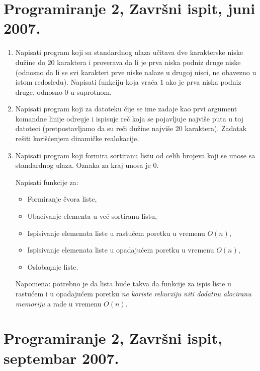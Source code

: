 \section{Programiranje 2, Zavr\v{s}ni ispit, juni 2007.}


\begin{enumerate}


\item
Napisati program koji sa standardnog ulaza u\v citava dve
karakterske niske du\v zine do $20$ karaktera i proverava da li je
prva niska podniz druge niske (odnosno da li se svi karakteri prve
niske nalaze u drugoj nisci, ne obavezno u istom redosledu).
Napisati funkciju koja vra\' ca $1$ ako je prva niska podniz
druge, odnosno $0$ u suprotnom.

\item
Napisati program koji za datoteku \v cije se ime zadaje kao prvi
argument komandne linije odre\d uje i ispisuje re\v c koja se
pojavljuje najvi\v se puta u toj datoteci (pretpostavljamo da su
re\v ci du\v zine najvi\v se $20$ karaktera). Zadatak re\v siti
kori\v s\' cenjem dinami\v cke realokacije.


\item
Napisati program koji formira sortiranu listu od celih brojeva
koji se unose sa standardnog ulaza. Oznaka za kraj unosa je $0$.

Napisati funkcije za:

\begin{itemize}
\item Formiranje \v cvora liste,
\item Ubacivanje elementa u ve\' c sortiranu listu,
\item Ispisivanje elemenata liste u rastu\' cem poretku u vremenu $O(n)$,
\item Ispisivanje elemenata liste u opadaju\' cem poretku u vremenu $O(n)$,
\item Osloba\d anje liste.
\end{itemize}

Napomena: potrebno je da lista bude takva da funkcije za ispis
liste u rastu\' cem i u opadaju\' cem poretku \emph{ne koriste
rekurziju niti dodatnu alociranu memoriju} a rade u vremenu
$O(n)$.
\end{enumerate}



\section{Programiranje 2, Zavr\v{s}ni ispit, septembar 2007.}




